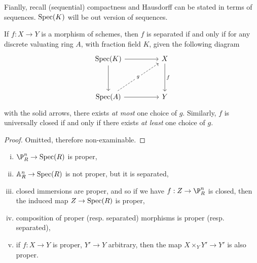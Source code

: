 \documentclass{article}
\begin{document}
Fianlly, recall (sequential) compactness and Hausdorff can be stated in terms of sequences. \(\operatorname{Spec}(K)\) will be out version of sequences.

\begin{theorem}
    If \(f : X \to Y\) is a morphism of schemes, then \(f\) is separated if and only if for any discrete valuating ring \(A\), with fraction field \(K\), given the following diagram
    \[\begin{tikzcd}
        {\Spec(K)} && X \\
        \\
        {\Spec(A)} && Y
        \arrow[from=1-1, to=3-1]
        \arrow[from=1-1, to=1-3]
        \arrow["f", from=1-3, to=3-3]
        \arrow[from=3-1, to=3-3]
        \arrow["g"{description}, dashed, from=3-1, to=1-3]
    \end{tikzcd}\]
    with the solid arrows, there exists \emph{at most} one choice of \(g\). Similarly, \(f\) is universally closed if and only if there exists \emph{at least} one choice of \(g\).
\end{theorem}

\begin{proof}
    Omitted, therefore non-examinable.
\end{proof}

\begin{corollary}
    \begin{enumerate}[(i)]
        \item \(\P^n_R \to \Spec(R)\) is proper,
        \item \(\mathbb{A}_{R}^{n} \to \operatorname{Spec}(R)\) is not proper, but it is separated,
        \item closed immersions are proper, and so if we have \(f : Z \to \P^n_R\) is closed, then the induced map \(Z \to \operatorname{Spec}(R)\) is proper,
        \item composition of proper (resp. separated) morphisms is proper (resp. separated),
        \item if \(f : X \to Y\) is proper, \(Y' \to Y\) arbitrary, then the map \(X \times_Y Y' \to Y'\) is also proper.
    \end{enumerate}
\end{corollary}
\end{document}
